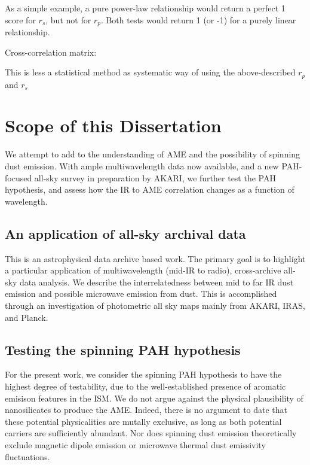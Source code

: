      As a simple example, a pure power-law relationship would return a perfect 1 score for $r_s$, but not for $r_p$. Both tests would return 1 (or -1) for a purely linear relationship.



    Cross-correlation matrix:

    This is less a statistical method as systematic way of using the above-described $r_p$ and $r_s$
\section{Scope of this Dissertation}
    We attempt to add to the understanding of AME and the possibility of spinning dust emission. With ample multiwavelength data now available, and a new PAH-focused all-sky survey in preparation by AKARI, we further test the PAH hypothesis, and assess how the IR to AME correlation changes as a function of wavelength.

  \subsection{An application of all-sky archival data}
    This is an astrophysical data archive based work. The primary goal is to highlight a particular application of multiwavelength (mid-IR to radio), cross-archive all-sky data analysis. We describe the interrelatedness between mid to far IR dust emission and possible microwave emission from dust. This is accomplished through an investigation of photometric all sky maps mainly from AKARI, IRAS, and Planck.

  \subsection{Testing the spinning PAH hypothesis}
    For the present work, we consider the spinning PAH hypothesis to have the highest degree of testability, due to the well-established presence of aromatic emisison features in the ISM.  We do not argue against the physical plausibility of nanosilicates to produce the AME. Indeed, there is no argument to date that these potential physicalities are mutally exclusive, as long as both potential carriers are sufficiently abundant. Nor does spinning dust emission theoretically exclude magnetic dipole emission or microwave thermal dust emissivity fluctuations.

